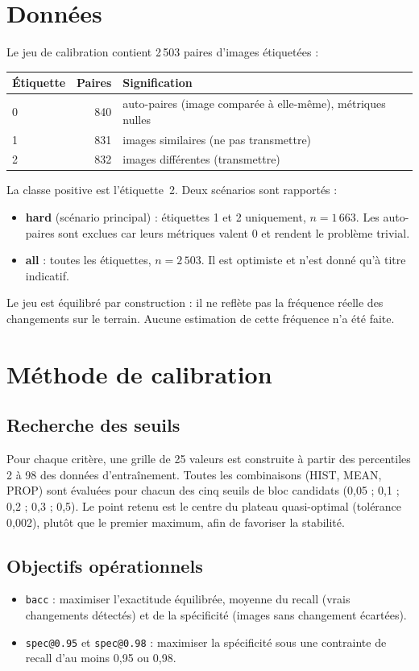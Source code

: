 \documentclass[11pt,a4paper]{article}
\begin{document}
	\section{Données}
	Le jeu de calibration contient 2\,503 paires d'images étiquetées :
	\begin{center}
		\begin{tabular}{lrl}
			\toprule
			Étiquette & Paires & Signification \\
			\midrule
			0 & 840 & auto-paires (image comparée à elle-même), métriques nulles \\
			1 & 831 & images similaires (ne pas transmettre) \\
			2 & 832 & images différentes (transmettre) \\
			\bottomrule
		\end{tabular}
	\end{center}
	La classe positive est l'étiquette~2. Deux scénarios sont rapportés :
	\begin{itemize}[nosep]
		\item \textbf{hard} (scénario principal) : étiquettes 1 et 2 uniquement, $n=1\,663$. Les auto-paires sont exclues
		car leurs métriques valent 0 et rendent le problème trivial.
		\item \textbf{all} : toutes les étiquettes, $n=2\,503$. Il est optimiste et n'est donné qu'à titre indicatif.
	\end{itemize}
	Le jeu est équilibré par construction : il ne reflète pas la fréquence réelle des changements sur le terrain.
	Aucune estimation de cette fréquence n'a été faite.
	
	\section{Méthode de calibration}
	
	\subsection{Recherche des seuils}
	Pour chaque critère, une grille de 25 valeurs est construite à partir des percentiles 2 à 98 des données
	d'entraînement. Toutes les combinaisons (HIST, MEAN, PROP) sont évaluées pour chacun des cinq seuils de bloc
	candidats (0,05 ; 0,1 ; 0,2 ; 0,3 ; 0,5). Le point retenu est le centre du plateau quasi-optimal (tolérance
	0,002), plutôt que le premier maximum, afin de favoriser la stabilité.
	
	\subsection{Objectifs opérationnels}
	\begin{itemize}[nosep]
		\item \texttt{bacc} : maximiser l'exactitude équilibrée, moyenne du recall (vrais changements détectés) et de la
		spécificité (images sans changement écartées).
		\item \texttt{spec@0.95} et \texttt{spec@0.98} : maximiser la spécificité sous une contrainte de recall d'au moins 0,95
		ou 0,98.
	\end{itemize}
	
\end{document}
